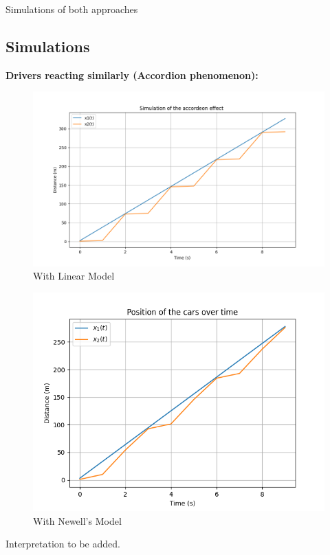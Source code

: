 \documentclass{beamer}
\begin{document}
\begin{frame}{Simulations of both approaches}
	\subsection{Simulations}
	\begin{center}
		\textbf{Drivers reacting similarly (Accordion phenomenon):}
	\end{center}
	\begin{minipage}{0.48\textwidth}
		\centering
		\begin{figure}
			\includegraphics[width=\textwidth]{Accordeon1.png}
			\caption{With Linear Model}
		\end{figure}
	\end{minipage}\hfill
	\begin{minipage}{0.48\textwidth}
		\centering
		\begin{figure}
			\includegraphics[width=\textwidth]{1W2_Accord.png}
			\caption{With Newell's Model}
		\end{figure}
	\end{minipage}
	Interpretation to be added.
\end{frame}
\end{document}
